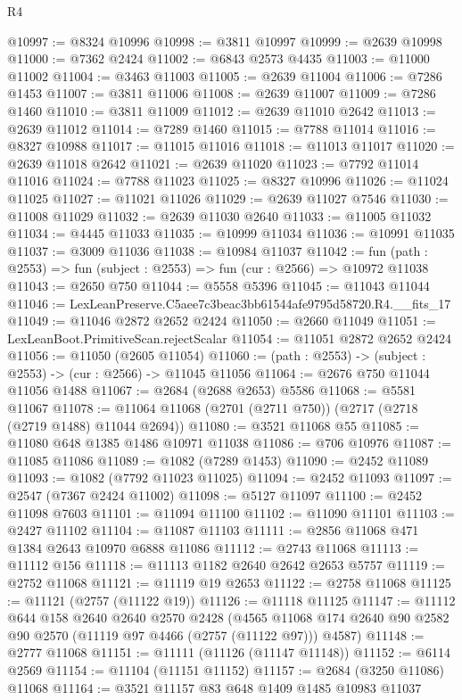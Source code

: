 \begin{lexlean}{R4}
\begin{coremodule}
@10997 := @8324 @10996
@10998 := @3811 @10997
@10999 := @2639 @10998
@11000 := @7362 @2424
@11002 := @6843 @2573 @4435
@11003 := @11000 @11002
@11004 := @3463 @11003
@11005 := @2639 @11004
@11006 := @7286 @1453
@11007 := @3811 @11006
@11008 := @2639 @11007
@11009 := @7286 @1460
@11010 := @3811 @11009
@11012 := @2639 @11010 @2642
@11013 := @2639 @11012
@11014 := @7289 @1460
@11015 := @7788 @11014
@11016 := @8327 @10988
@11017 := @11015 @11016
@11018 := @11013 @11017
@11020 := @2639 @11018 @2642
@11021 := @2639 @11020
@11023 := @7792 @11014 @11016
@11024 := @7788 @11023
@11025 := @8327 @10996
@11026 := @11024 @11025
@11027 := @11021 @11026
@11029 := @2639 @11027 @7546
@11030 := @11008 @11029
@11032 := @2639 @11030 @2640
@11033 := @11005 @11032
@11034 := @4445 @11033
@11035 := @10999 @11034
@11036 := @10991 @11035
@11037 := @3009 @11036
@11038 := @10984 @11037
@11042 := fun (path : @2553) => fun (subject : @2553) => fun (cur : @2566) => @10972 @11038
@11043 := @2650 @750
@11044 := @5558 @5396
@11045 := @11043 @11044
@11046 := LexLeanPreserve.C5aee7c3beac3bb61544afe9795d58720.R4.__fits_17
@11049 := @11046 @2872 @2652 @2424
@11050 := @2660 @11049
@11051 := LexLeanBoot.PrimitiveScan.rejectScalar
@11054 := @11051 @2872 @2652 @2424
@11056 := @11050 (@2605 @11054)
@11060 := (path : @2553) -> (subject : @2553) -> (cur : @2566) -> @11045 @11056
@11064 := @2676 @750 @11044 @11056 @1488
@11067 := @2684 (@2688 @2653) @5586
@11068 := @5581 @11067
@11078 := @11064 @11068 (@2701 (@2711 @750)) (@2717 (@2718 (@2719 @1488) @11044 @2694))
@11080 := @3521 @11068 @55
@11085 := @11080 @648 @1385 @1486 @10971 @11038
@11086 := @706 @10976
@11087 := @11085 @11086
@11089 := @1082 (@7289 @1453)
@11090 := @2452 @11089
@11093 := @1082 (@7792 @11023 @11025)
@11094 := @2452 @11093
@11097 := @2547 (@7367 @2424 @11002)
@11098 := @5127 @11097
@11100 := @2452 @11098 @7603
@11101 := @11094 @11100
@11102 := @11090 @11101
@11103 := @2427 @11102
@11104 := @11087 @11103
@11111 := @2856 @11068 @471 @1384 @2643 @10970 @6888 @11086
@11112 := @2743 @11068
@11113 := @11112 @156
@11118 := @11113 @1182 @2640 @2642 @2653 @5757
@11119 := @2752 @11068
@11121 := @11119 @19 @2653
@11122 := @2758 @11068
@11125 := @11121 (@2757 (@11122 @19))
@11126 := @11118 @11125
@11147 := @11112
    @644
    @158
    @2640
    @2640
    @2570
    @2428
    (@4565 @11068 @174 @2640 @90 @2582 @90 @2570 (@11119 @97 @4466 (@2757 (@11122 @97))) @4587)
@11148 := @2777 @11068
@11151 := @11111 (@11126 (@11147 @11148))
@11152 := @6114 @2569
@11154 := @11104 (@11151 @11152)
@11157 := @2684 (@3250 @11086) @11068
@11164 := @3521 @11157 @83 @648 @1409 @1485 @10983 @11037

\end{coremodule}
\end{lexlean}
